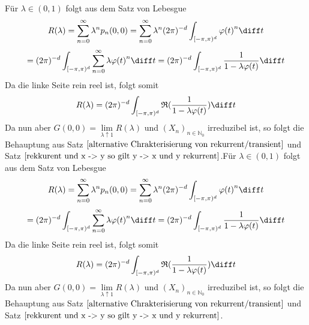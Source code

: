 Für $\lambda \in (0,1)$ folgt aus dem Satz von Lebesgue
\begin{equation*}
R(\lambda) = \sum_{n=0}^{\infty} \lambda^{n} p_{n}(0,0) = \sum_{n = 0}^{\infty} \lambda^{n} (2 \pi)^{-d}  \int_{[-\pi, \pi)^{d}} {\varphi (t)}^{n} \diff t
\end{equation*}
\begin{equation*}
= (2\pi)^{-d}  \int_{[-\pi, \pi)^{d}} \sum_{n=0}^{\infty} {\lambda \varphi (t)}^{n} \diff t = (2\pi)^{-d}  \int_{[-\pi, \pi)^{d}} \dfrac{1}{1 - \lambda \varphi(t)} \diff t
\end{equation*}
Da die linke Seite rein reel ist, folgt somit
\begin{equation*}
R(\lambda) = (2\pi)^{-d}  \int_{[-\pi, \pi)^{d}} \mathfrak{R}({\dfrac{1}{1 - \lambda \varphi(t)}}) \diff t
\end{equation*}
Da nun aber $G(0,0) = \lim \limits_{\lambda \uparrow 1} R(\lambda)$ und $(X_{n})_{n \in \mathbb{N}_{0}}$ irreduzibel ist, so folgt die Behauptung aus Satz $\ref{alternative Chrakterisierung von rekurrent/transient}$ und Satz $\ref{rekkurent und x -> y so gilt y -> x und y rekurrent}$.Für $\lambda \in (0,1)$ folgt aus dem Satz von Lebesgue
\begin{equation*}
R(\lambda) = \sum_{n=0}^{\infty} \lambda^{n} p_{n}(0,0) = \sum_{n = 0}^{\infty} \lambda^{n} (2 \pi)^{-d}  \int_{[-\pi, \pi)^{d}} {\varphi (t)}^{n} \diff t
\end{equation*}
\begin{equation*}
= (2\pi)^{-d}  \int_{[-\pi, \pi)^{d}} \sum_{n=0}^{\infty} {\lambda \varphi (t)}^{n} \diff t = (2\pi)^{-d}  \int_{[-\pi, \pi)^{d}} \dfrac{1}{1 - \lambda \varphi(t)} \diff t
\end{equation*}
Da die linke Seite rein reel ist, folgt somit
\begin{equation*}
R(\lambda) = (2\pi)^{-d}  \int_{[-\pi, \pi)^{d}} \mathfrak{R}({\dfrac{1}{1 - \lambda \varphi(t)}}) \diff t
\end{equation*}
Da nun aber $G(0,0) = \lim \limits_{\lambda \uparrow 1} R(\lambda)$ und $(X_{n})_{n \in \mathbb{N}_{0}}$ irreduzibel ist, so folgt die Behauptung aus Satz $\ref{alternative Chrakterisierung von rekurrent/transient}$ und Satz $\ref{rekkurent und x -> y so gilt y -> x und y rekurrent}$.



